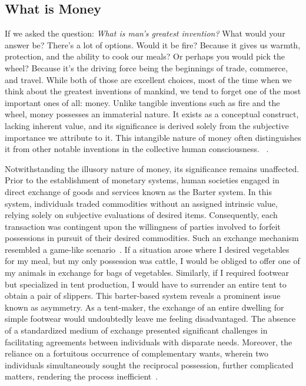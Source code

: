 \subsection{What is Money}
If we asked the question: \textit{What is man's greatest invention?} What would your answer be? There's a lot of options. Would it be fire?
Because it gives us warmth, protection, and the ability to cook our meals? Or perhaps you would pick the wheel? Because it's the driving force being the
beginnings of trade, commerce, and travel. While both of those are excellent choices, most of the time when we think about the greatest inventions of
mankind, we tend to forget one of the most important ones of all: money. Unlike tangible inventions such as fire and the wheel, money possesses an
immaterial nature. It exists as a conceptual construct, lacking inherent value, and its significance is derived solely from the subjective importance we
attribute to it. This intangible nature of money often distinguishes it from other notable inventions in the collective human consciousness.
~\cite{smith2010wealth}.

Notwithstanding the illusory nature of money, its significance remains unaffected. Prior to the establishment of monetary systems, human
societies engaged in direct exchange of goods and services known as the Barter system. In this system, individuals traded commodities without
an assigned intrinsic value, relying solely on subjective evaluations of desired items. Consequently, each transaction was contingent upon
the willingness of parties involved to forfeit possessions in pursuit of their desired commodities. Such an exchange mechanism resembled a
game-like scenario~\cite{durlauf2016new}. If a situation arose where I desired vegetables for my meal, but my only possession was cattle,
I would be obliged to offer one of my animals in exchange for bags of vegetables. Similarly, if I required footwear but specialized in tent
production, I would have to surrender an entire tent to obtain a pair of slippers. This barter-based system reveals a prominent issue known
as asymmetry. As a tent-maker, the exchange of an entire dwelling for simple footwear would undoubtedly leave me feeling disadvantaged. The
absence of a standardized medium of exchange presented significant challenges in facilitating agreements between individuals with disparate
needs. Moreover, the reliance on a fortuitous occurrence of complementary wants, wherein two individuals simultaneously sought the reciprocal
possession, further complicated matters, rendering the process inefficient~\cite{goodhart1998two}.

